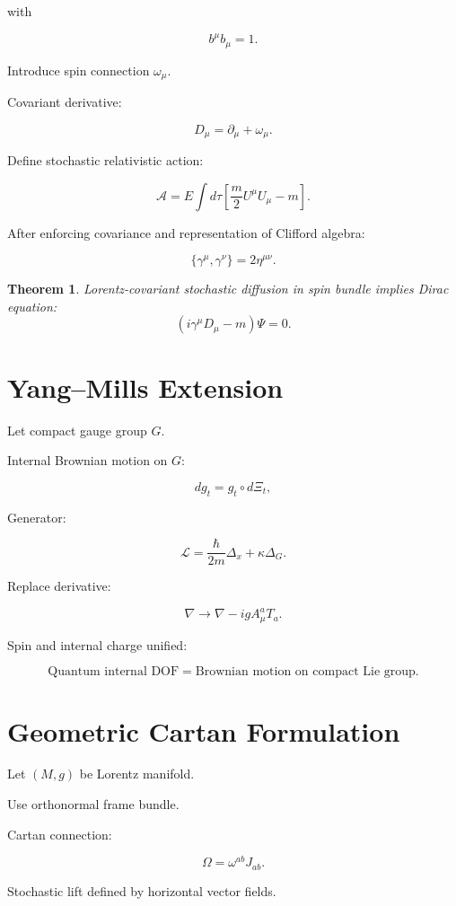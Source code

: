 \documentclass[12pt]{article}
\newtheorem{theorem}{Theorem}
\begin{document}
with

\[
b^\mu b_\mu = 1.
\]

Introduce spin connection $\omega_\mu$.

Covariant derivative:

\[
D_\mu=\partial_\mu+\omega_\mu.
\]

Define stochastic relativistic action:

\[
\mathcal{A}
=
E\int d\tau
\left[
\frac{m}{2}U^\mu U_\mu
- m
\right].
\]

After enforcing covariance and representation of Clifford algebra:

\[
\{\gamma^\mu,\gamma^\nu\}=2\eta^{\mu\nu}.
\]

\begin{theorem}
Lorentz-covariant stochastic diffusion in spin bundle
implies Dirac equation:
\[
(i\gamma^\mu D_\mu - m)\Psi=0.
\]
\end{theorem}

\section{Yang–Mills Extension}

Let compact gauge group $G$.

Internal Brownian motion on $G$:

\[
dg_t = g_t \circ d\Xi_t,
\]

Generator:

\[
\mathcal{L}
=
\frac{\hbar}{2m}\Delta_x
+
\kappa\Delta_G.
\]

Replace derivative:

\[
\nabla \to \nabla - igA_\mu^a T_a.
\]

Spin and internal charge unified:

\[
\text{Quantum internal DOF} =
\text{Brownian motion on compact Lie group}.
\]

\section{Geometric Cartan Formulation}

Let $(M,g)$ be Lorentz manifold.

Use orthonormal frame bundle.

Cartan connection:

\[
\Omega = \omega^{ab}J_{ab}.
\]

Stochastic lift defined by horizontal vector fields.
\end{document}
